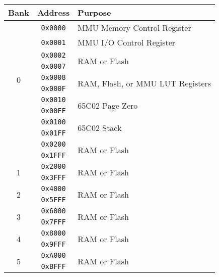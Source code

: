 \begin{table}[ht]
    \begin{center}
        \begin{tabular}{|c|c|l|} \hline
            Bank & Address & Purpose \\ \hline\hline
            \multirow{10}{*}{0} & \verb+0x0000+ & MMU Memory Control Register \\ \cline{2-3}
            & \verb+0x0001+ & MMU I/O Control Register \\ \cline{2-3}
            & \verb+0x0002+ & \multirow{2}{*}{RAM or Flash} \\ \cline{2-2}
            & \verb+0x0007+ & \\ \cline{2-3}
            & \verb+0x0008+ & \multirow{2}{*}{RAM, Flash, or MMU LUT Registers} \\ \cline{2-2}
            & \verb+0x000F+ & \\ \cline{2-3}
            & \verb+0x0010+ & \multirow{2}{*}{65C02 Page Zero} \\ \cline{2-2}
            & \verb+0x00FF+ & \\ \cline{2-3}
            & \verb+0x0100+ & \multirow{2}{*}{65C02 Stack} \\ \cline{2-2}
            & \verb+0x01FF+ & \\ \cline{2-3}
            & \verb+0x0200+ & \multirow{2}{*}{RAM or Flash} \\ \cline{2-2}
            & \verb+0x1FFF+ & \\ \hline
            \multirow{2}{*}{1} & \verb+0x2000+ & \multirow{2}{*}{RAM or Flash} \\ \cline{2-2}
            & \verb+0x3FFF+ & \\ \hline
            \multirow{2}{*}{2} & \verb+0x4000+ & \multirow{2}{*}{RAM or Flash} \\ \cline{2-2}
            & \verb+0x5FFF+ & \\ \hline
            \multirow{2}{*}{3} & \verb+0x6000+ & \multirow{2}{*}{RAM or Flash} \\ \cline{2-2}
            & \verb+0x7FFF+ & \\ \hline
            \multirow{2}{*}{4} & \verb+0x8000+ & \multirow{2}{*}{RAM or Flash} \\ \cline{2-2}
            & \verb+0x9FFF+ & \\ \hline
            \multirow{2}{*}{5} & \verb+0xA000+ & \multirow{2}{*}{RAM or Flash} \\ \cline{2-2}
            & \verb+0xBFFF+ & \\ \hline

\end{tabular}
\end{center}
\end{table}

